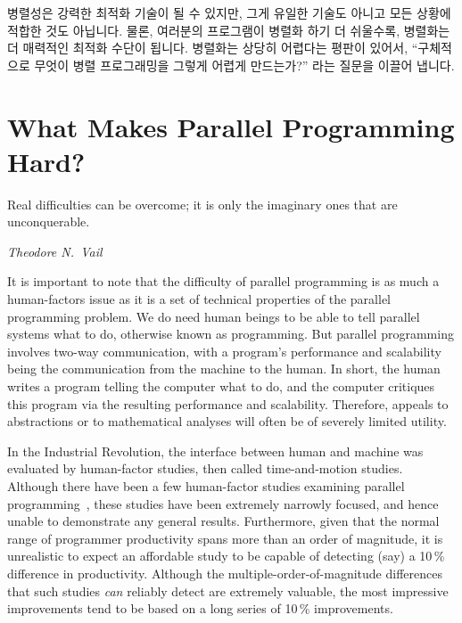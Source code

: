 병렬성은 강력한 최적화 기술이 될 수 있지만, 그게 유일한 기술도 아니고 모든
상황에 적합한 것도 아닙니다.
물론, 여러분의 프로그램이 병렬화 하기 더 쉬울수록, 병렬화는 더 매력적인 최적화
수단이 됩니다.
병렬화는 상당히 어렵다는 평판이 있어서, ``구체적으로 무엇이 병렬 프로그래밍을
그렇게 어렵게 만드는가?'' 라는 질문을 이끌어 냅니다.

\section{What Makes Parallel Programming Hard?}
\label{sec:intro:What Makes Parallel Programming Hard?}
%
\epigraph{Real difficulties can be overcome; it is only the imaginary
	  ones that are unconquerable.}{\emph{Theodore N.~Vail}}


It is important to note that the difficulty of parallel programming
is as much a human-factors issue as it is a set of technical properties of the
parallel programming problem.
We do need human beings to be able to tell parallel
systems what to do, otherwise known as programming.
But parallel programming involves two-way communication, with
a program's performance and scalability being the communication from
the machine to the human.
In short, the human writes a program telling the computer what to do,
and the computer critiques this program via the resulting performance and
scalability.
Therefore, appeals to abstractions or to mathematical analyses will
often be of severely limited utility.

In the Industrial Revolution, the interface between human and machine
was evaluated by human-factor studies, then called time-and-motion
studies.
Although there have been a few human-factor studies examining parallel
programming~\cite{RyanEccles2005HPCSNovice,RyanEccles2006HPCSNoviceNeeds,
LorinHochstein2005SC,DuaneSzafron1994PEMPDS}, these studies have
been extremely narrowly focused, and hence unable to demonstrate any
general results.
Furthermore, given that the normal range of programmer productivity
spans more than an order of magnitude, it is unrealistic to expect
an affordable study to be capable of detecting (say) a 10\,\% difference
in productivity.
Although the multiple-order-of-magnitude differences that such studies
\emph{can} reliably detect are extremely valuable, the most impressive
improvements tend to be based on a long series of 10\,\% improvements.

